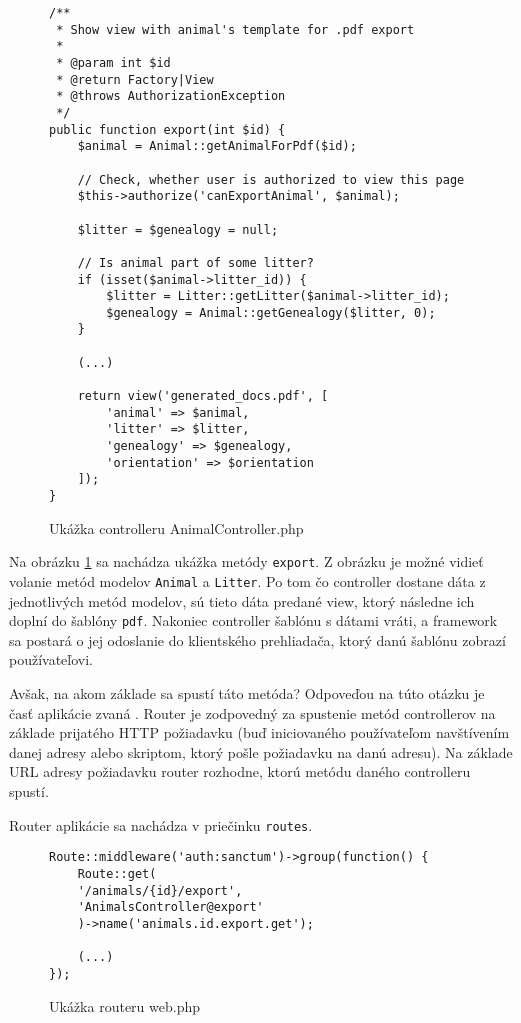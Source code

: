 \begin{figure}[H]
\begin{verbatim}
/**
 * Show view with animal's template for .pdf export
 *
 * @param int $id
 * @return Factory|View
 * @throws AuthorizationException
 */
public function export(int $id) {
    $animal = Animal::getAnimalForPdf($id);

    // Check, whether user is authorized to view this page
    $this->authorize('canExportAnimal', $animal);

    $litter = $genealogy = null;

    // Is animal part of some litter?
    if (isset($animal->litter_id)) {
        $litter = Litter::getLitter($animal->litter_id);
        $genealogy = Animal::getGenealogy($litter, 0);
    }
    
    (...)
        
    return view('generated_docs.pdf', [
        'animal' => $animal,
        'litter' => $litter,
        'genealogy' => $genealogy,
        'orientation' => $orientation
    ]);
}
\end{verbatim}
\caption[Ukážka controlleru AnimalController.php]
{Ukážka controlleru AnimalController.php}
\label{animal-controller-view-code}
\end{figure}

Na obrázku \ref{animal-controller-view-code} sa nachádza ukážka metódy \texttt{export}. Z obrázku je možné vidieť volanie metód modelov \texttt{Animal} a \texttt{Litter}. Po tom čo controller dostane dáta z jednotlivých metód modelov, sú tieto dáta predané view, ktorý následne ich doplní do šablóny \texttt{pdf}. Nakoniec controller šablónu s dátami vráti, a framework sa postará o jej odoslanie do klientského prehliadača, ktorý danú šablónu zobrazí používateľovi.

Avšak, na akom základe sa spustí táto metóda? Odpoveďou na túto otázku je časť aplikácie zvaná .
Router je zodpovedný za spustenie metód controllerov na základe prijatého HTTP požiadavku (buď iniciovaného používateľom navštívením danej adresy alebo skriptom, ktorý pošle požiadavku na danú adresu). Na základe URL adresy požiadavku router rozhodne, ktorú metódu daného controlleru spustí.

Router aplikácie sa nachádza v priečinku \texttt{routes}.

\begin{figure}[H]
\begin{verbatim}
Route::middleware('auth:sanctum')->group(function() {
    Route::get(
    '/animals/{id}/export',
    'AnimalsController@export'
    )->name('animals.id.export.get');
    
    (...)
});
\end{verbatim}
\caption[Ukážka routeru web.php]
{Ukážka routeru web.php}
\label{router-code}
\end{figure}


